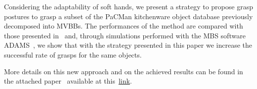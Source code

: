 Considering the adaptability of soft hands, we present a strategy to propose grasp postures to grasp a subset of the PaCMan kitchenware object database previously decomposed into MVBBs. The performances of the method are compared with those presented in~\cite{Bonilla:Humanoids:2015} and, through simulations performed with the MBS software ADAMS\texttrademark~\cite{ADAMS:ONLINE}, we show that with the strategy presented in this paper we increase the successful rate of grasps for the same objects.

More details on this new approach and on the achieved results can be found in the attached paper~\cite{Bonilla:IROS:2015} available at this~\href{./attachedPapers/GraspPlanningBoundingBoxes.pdf}{link}. 